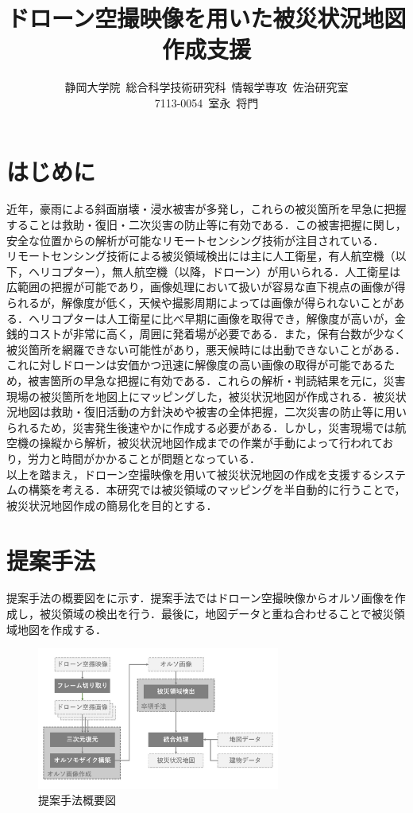 \documentclass[a4paper, twocolumn, xelatex, 10pt, ja=standard, Ligatures=TeX]{bxjsarticle}
\title{\LARGE ドローン空撮映像を用いた被災状況地図作成支援}
\author{静岡大学院\ 総合科学技術研究科\ 情報学専攻\ 佐治研究室 \\ 7113-0054\ 室永\ 将門}
\date{}
\begin{document}
	
\maketitle

\section{はじめに}
	近年，豪雨による斜面崩壊・浸水被害が多発し，これらの被災箇所を早急に把握することは救助・復旧・二次災害の防止等に有効である．この被害把握に関し，安全な位置からの解析が可能なリモートセンシング技術が注目されている．\\
	\quad リモートセンシング技術による被災領域検出には主に人工衛星，有人航空機（以下，ヘリコプター），無人航空機（以降，ドローン）が用いられる．人工衛星は広範囲の把握が可能であり，画像処理において扱いが容易な直下視点の画像が得られるが，解像度が低く，天候や撮影周期によっては画像が得られないことがある．ヘリコプターは人工衛星に比べ早期に画像を取得でき，解像度が高いが，金銭的コストが非常に高く，周囲に発着場が必要である．また，保有台数が少なく被災箇所を網羅できない可能性があり，悪天候時には出動できないことがある．これに対しドローンは安価かつ迅速に解像度の高い画像の取得が可能であるため，被害箇所の早急な把握に有効である．これらの解析・判読結果を元に，災害現場の被災箇所を地図上にマッピングした，被災状況地図が作成される．被災状況地図は救助・復旧活動の方針決めや被害の全体把握，二次災害の防止等に用いられるため，災害発生後速やかに作成する必要がある．しかし，災害現場では航空機の操縦から解析，被災状況地図作成までの作業が手動によって行われており，労力と時間がかかることが問題となっている\cite{art00}．\\
	\quad 以上を踏まえ，ドローン空撮映像を用いて被災状況地図の作成を支援するシステムの構築を考える．本研究では被災領域のマッピングを半自動的に行うことで，被災状況地図作成の簡易化を目的とする．

\section{提案手法}
	提案手法の概要図をに示す．提案手法ではドローン空撮映像からオルソ画像を作成し，被災領域の検出を行う．最後に，地図データと重ね合わせることで被災領域地図を作成する．
	
\begin{figure}[b]
	\centering
		\includegraphics[width=8cm]{img/howto.jpg}
		\caption{提案手法概要図}
		\label{img01}
\end{figure}
\end{document}
